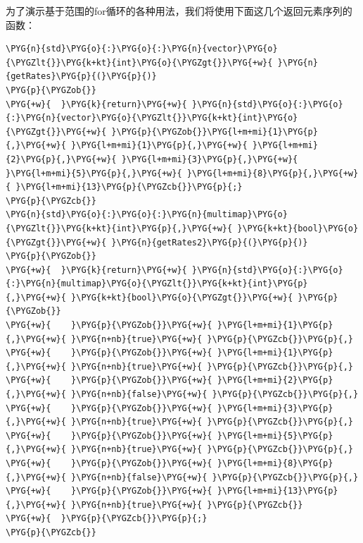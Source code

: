 
为了演示基于范围的for循环的各种用法，我们将使用下面这几个返回元素序列的函数：



\begin{codeblockbg}
\begin{Verbatim}[commandchars=\\\{\},breaklines=true,breakanywhere=true,fontsize=\codefont,xleftmargin=17bp]
\PYG{n}{std}\PYG{o}{:}\PYG{o}{:}\PYG{n}{vector}\PYG{o}{\PYGZlt{}}\PYG{k+kt}{int}\PYG{o}{\PYGZgt{}}\PYG{+w}{ }\PYG{n}{getRates}\PYG{p}{(}\PYG{p}{)}
\PYG{p}{\PYGZob{}}
\PYG{+w}{  }\PYG{k}{return}\PYG{+w}{ }\PYG{n}{std}\PYG{o}{:}\PYG{o}{:}\PYG{n}{vector}\PYG{o}{\PYGZlt{}}\PYG{k+kt}{int}\PYG{o}{\PYGZgt{}}\PYG{+w}{ }\PYG{p}{\PYGZob{}}\PYG{l+m+mi}{1}\PYG{p}{,}\PYG{+w}{ }\PYG{l+m+mi}{1}\PYG{p}{,}\PYG{+w}{ }\PYG{l+m+mi}{2}\PYG{p}{,}\PYG{+w}{ }\PYG{l+m+mi}{3}\PYG{p}{,}\PYG{+w}{ }\PYG{l+m+mi}{5}\PYG{p}{,}\PYG{+w}{ }\PYG{l+m+mi}{8}\PYG{p}{,}\PYG{+w}{ }\PYG{l+m+mi}{13}\PYG{p}{\PYGZcb{}}\PYG{p}{;}
\PYG{p}{\PYGZcb{}}
\PYG{n}{std}\PYG{o}{:}\PYG{o}{:}\PYG{n}{multimap}\PYG{o}{\PYGZlt{}}\PYG{k+kt}{int}\PYG{p}{,}\PYG{+w}{ }\PYG{k+kt}{bool}\PYG{o}{\PYGZgt{}}\PYG{+w}{ }\PYG{n}{getRates2}\PYG{p}{(}\PYG{p}{)}
\PYG{p}{\PYGZob{}}
\PYG{+w}{  }\PYG{k}{return}\PYG{+w}{ }\PYG{n}{std}\PYG{o}{:}\PYG{o}{:}\PYG{n}{multimap}\PYG{o}{\PYGZlt{}}\PYG{k+kt}{int}\PYG{p}{,}\PYG{+w}{ }\PYG{k+kt}{bool}\PYG{o}{\PYGZgt{}}\PYG{+w}{ }\PYG{p}{\PYGZob{}}
\PYG{+w}{    }\PYG{p}{\PYGZob{}}\PYG{+w}{ }\PYG{l+m+mi}{1}\PYG{p}{,}\PYG{+w}{ }\PYG{n+nb}{true}\PYG{+w}{ }\PYG{p}{\PYGZcb{}}\PYG{p}{,}
\PYG{+w}{    }\PYG{p}{\PYGZob{}}\PYG{+w}{ }\PYG{l+m+mi}{1}\PYG{p}{,}\PYG{+w}{ }\PYG{n+nb}{true}\PYG{+w}{ }\PYG{p}{\PYGZcb{}}\PYG{p}{,}
\PYG{+w}{    }\PYG{p}{\PYGZob{}}\PYG{+w}{ }\PYG{l+m+mi}{2}\PYG{p}{,}\PYG{+w}{ }\PYG{n+nb}{false}\PYG{+w}{ }\PYG{p}{\PYGZcb{}}\PYG{p}{,}
\PYG{+w}{    }\PYG{p}{\PYGZob{}}\PYG{+w}{ }\PYG{l+m+mi}{3}\PYG{p}{,}\PYG{+w}{ }\PYG{n+nb}{true}\PYG{+w}{ }\PYG{p}{\PYGZcb{}}\PYG{p}{,}
\PYG{+w}{    }\PYG{p}{\PYGZob{}}\PYG{+w}{ }\PYG{l+m+mi}{5}\PYG{p}{,}\PYG{+w}{ }\PYG{n+nb}{true}\PYG{+w}{ }\PYG{p}{\PYGZcb{}}\PYG{p}{,}
\PYG{+w}{    }\PYG{p}{\PYGZob{}}\PYG{+w}{ }\PYG{l+m+mi}{8}\PYG{p}{,}\PYG{+w}{ }\PYG{n+nb}{false}\PYG{+w}{ }\PYG{p}{\PYGZcb{}}\PYG{p}{,}
\PYG{+w}{    }\PYG{p}{\PYGZob{}}\PYG{+w}{ }\PYG{l+m+mi}{13}\PYG{p}{,}\PYG{+w}{ }\PYG{n+nb}{true}\PYG{+w}{ }\PYG{p}{\PYGZcb{}}
\PYG{+w}{  }\PYG{p}{\PYGZcb{}}\PYG{p}{;}
\PYG{p}{\PYGZcb{}}
\end{Verbatim}
\end{codeblockbg}


